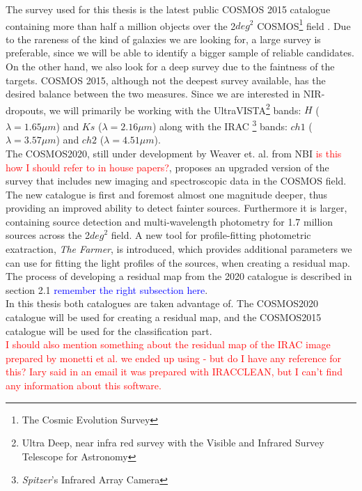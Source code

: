 The survey used for this thesis is the latest public COSMOS 2015 catalogue containing more than half a million objects over the 2$\si{deg}^2$ COSMOS\footnote{The Cosmic Evolution Survey} field \cite{Laigle_2016}. Due to the rareness of the kind of galaxies we are looking for, a large survey is preferable, since we will be able to identify a bigger sample of reliable candidates. On the other hand, we also look for a deep survey due to the faintness of the targets. COSMOS 2015, although not the deepest survey available, has the desired balance between the two measures. Since we are interested in NIR-dropouts, we will primarily be working with the UltraVISTA\footnote{Ultra Deep, near infra red survey with the Visible and Infrared Survey Telescope for Astronomy} bands: $H$ ($\lambda = 1.65 \si{\mu m}$) and $Ks$ ($\lambda = 2.16 \si{\mu m}$) along with the IRAC \footnote{\textit{Spitzer}'s Infrared Array Camera} bands: $ch1$ ($\lambda = 3.57 \si{\mu m}$) and $ch2$ ($\lambda = 4.51 \si{\mu m}$). \\
The COSMOS2020, still under development by Weaver et. al. from NBI \cite{Weaver_2020} \textcolor{red}{is this how I should refer to in house papers?}, proposes an upgraded version of the survey that includes new imaging and spectroscopic data in the COSMOS field. The new catalogue is first and foremost almost one magnitude deeper, thus providing an improved ability to detect fainter sources. Furthermore it is larger, containing source detection and multi-wavelength photometry for 1.7 million sources across the 2$\si{deg}^2$ field. A new tool for profile-fitting photometric exatraction, \textit{The Farmer}, is introduced, which provides additional parameters we can use for fitting the light profiles of the sources, when creating a residual map. The process of developing a residual map from the 2020 catalogue is described in section 2.1 \textcolor{blue}{remember the right subsection here}.\\ 
In this thesis both catalogues are taken advantage of. The COSMOS2020 catalogue will be used for creating a residual map, and the COSMOS2015 catalogue will be used for the classification part. \\
\textcolor{red}{I should also mention something about the residual map of the IRAC image prepared by monetti et al. we ended up using - but do I have any reference for this? Iary said in an email it was prepared with IRACCLEAN, but I can't find any information about this software.}\\

